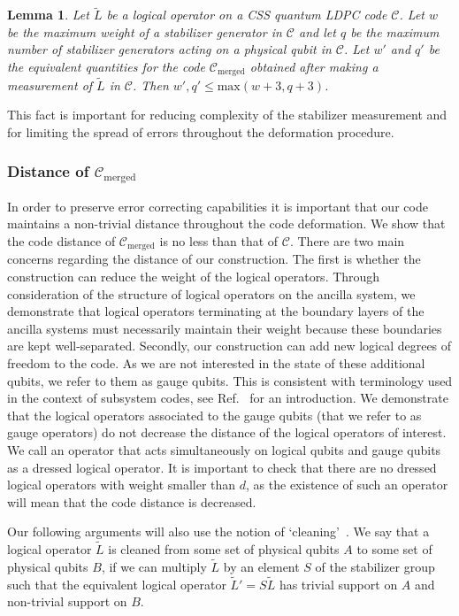 \documentclass[reprint,
superscriptaddress,
 amsmath,amssymb,
 aps, longbibliography
]{revtex4-1}
\newtheorem{lemma}{Lemma}
\newcommand{\rev}[1]{{#1}}
\begin{document}
\begin{lemma}
Let $\tilde{L}$ be a logical operator on a CSS quantum LDPC code $\mathcal{C}$. Let $w$ be the maximum weight of a stabilizer generator in $\mathcal{C}$ and let $q$ be the maximum number of stabilizer generators acting on a physical qubit in $\mathcal{C}$. Let $w'$ and $q'$ be the equivalent quantities for the code $\mathcal{C}_{\text{merged}}$ obtained after making a measurement of $\tilde{L}$ in $\mathcal{C}$. Then $w', q' \leq \textrm{max}(w + 3, q+3)$. 
\end{lemma}

This fact is important for reducing complexity of the stabilizer measurement and for limiting the spread of errors throughout the deformation procedure.

\subsubsection{\label{sec:distance}Distance of $\mathcal{C}_{\text{merged}}$}

In order to preserve error correcting capabilities it is important that our code maintains a non-trivial distance throughout the code deformation. We show that the code distance of $\mathcal{C}_{\text{merged}}$ is no less than that of $\mathcal{C}$. There are two main concerns regarding the distance of our construction.  The first is whether the construction can reduce the weight of the logical operators. \rev{Through consideration of the structure of logical operators on the ancilla system}, we demonstrate that logical operators terminating at the boundary layers of the ancilla systems must necessarily maintain their weight because these boundaries are kept well-separated. \rev{Secondly, our construction can add new logical degrees of freedom to the code. As we are not interested in the state of these additional qubits, we refer to them as gauge qubits. This is consistent with terminology used in the context of subsystem codes, see Ref.~\cite{Poulin2005} for an introduction. We demonstrate that the logical operators associated to the gauge qubits (that we refer to as gauge operators) do not decrease the distance of the logical operators of interest. We call an operator that acts simultaneously on logical qubits and gauge qubits as a dressed logical operator. It is important to check that there are no dressed logical operators with weight smaller than $d$, as the existence of such an operator will mean that the code distance is decreased.}

\rev{Our following arguments will also use the notion of `cleaning'~\cite{Bravyi_2009}. We say that a logical operator $\tilde{L}$ is cleaned from some set of physical qubits $A$ to some set of physical qubits $B$, if we can multiply $\tilde{L}$ by an element $S$ of the stabilizer group such that the equivalent logical operator $\tilde{L}' = S \tilde{L} $  has trivial support on $A$ and non-trivial support on $B$.}
\end{document}
